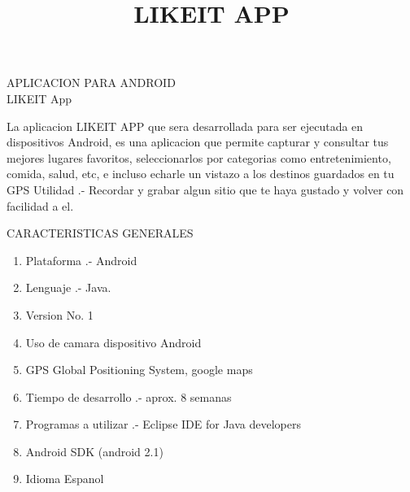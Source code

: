 \documentclass{beamer}
\title{LIKEIT APP}
\begin{document}
  \begin{frame}
    
    \titlepage
    
    \scriptsize
    
    \begin{center}
      APLICACION PARA ANDROID \\
      LIKEIT App \\
    \end{center}
    
    
    La aplicacion LIKEIT APP que sera desarrollada para ser ejecutada en dispositivos Android, es una aplicacion que permite capturar y consultar tus mejores lugares favoritos, seleccionarlos por categorias como entretenimiento, comida, salud, etc, e incluso echarle un vistazo a los destinos guardados en tu GPS 
    Utilidad .- Recordar y grabar algun sitio que te haya gustado y volver con facilidad a el.
    
  \end{frame}
  
   \begin{frame}
      
     
      \scriptsize
      
      \begin{center}
        CARACTERISTICAS GENERALES\\
      \end{center}
      
      \begin{enumerate}
      \item<1-> Plataforma .- Android
      \item<1-> Lenguaje .- Java.
      \item<1-> Version No. 1
      \item<1-> Uso de camara dispositivo Android
      \item<1-> GPS Global Positioning System, google maps
      \item<1-> Tiempo de desarrollo .- aprox. 8 semanas
      \item<1-> Programas a utilizar .- Eclipse IDE for Java developers
      \item<1-> Android SDK (android 2.1)
      \item<1-> Idioma{\tiny } Espanol
     \end{enumerate}
      
    \end{frame}
  
    
  
\end{document}
